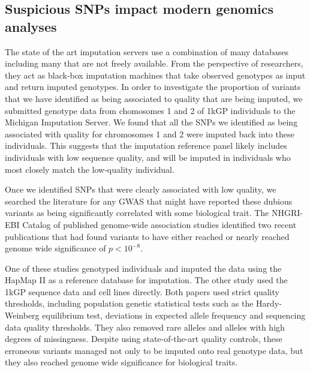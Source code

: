 \documentclass[9pt,lineno]{elife}
\begin{document}
\subsection{Suspicious SNPs impact modern genomics analyses}
The state of the art imputation servers use a combination of many databases including many that are not freely available.
From the perspective of researchers, they act as black-box imputation machines that take observed genotypes as input and return imputed genotypes.  
In order to investigate the proportion of variants that we have identified as being associated to quality that are being imputed, we submitted genotype data from chomosomes 1 and 2 of 1kGP individuals to the Michigan Imputation Server.
We found that all the SNPs we identified as being associated with quality for chromosomes 1 and 2 were imputed back into these individuals. 
This suggests that the imputation reference panel likely includes individuals with low sequence quality, and will be imputed in individuals who most closely match the low-quality individual. 


Once we identified SNPs that were clearly associated with low quality, we searched the literature for any GWAS that might have reported these dubious variants as being significantly correlated with some biological trait. 
The NHGRI-EBI Catalog of published genome-wide association studies identified two recent publications that had found variants to have either reached or nearly reached genome wide significance of $ p < 10^{-8}$.

One of these studies genotyped individuals and imputed the data using the HapMap II as a reference  database for imputation.
The other study used the 1kGP sequence data and cell lines directly.
Both papers used strict quality thresholds, including population genetic statistical tests such as the Hardy-Weinberg equilibrium test, deviations in expected allele frequency and sequencing data quality thresholds. 
They also removed rare alleles and alleles with high degrees of missingness. 
Despite using state-of-the-art quality controls, these erroneous variants managed not only to be imputed onto real genotype data, but they also reached genome wide significance for biological traits.
\end{document}
